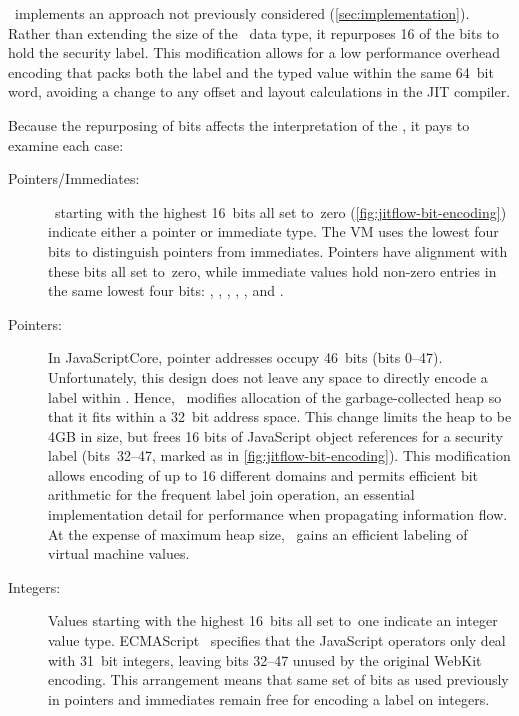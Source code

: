 \JitFlow\ implements an  approach not previously considered (\autoref{sec:implementation}).
Rather than extending the size of the \JSValue\ data type, it repurposes 16 of the bits to hold the security label.
This modification allows for a low performance overhead encoding that packs both the label and the typed value within the same 64~bit word, avoiding a change to any offset and layout calculations in the JIT compiler.

Because the repurposing of bits affects the interpretation of the \JSValue, it pays to examine each case:

\begin{description}

\item[Pointers/Immediates:]
\jsvalues\ starting with the highest 16~bits all set to~zero (\autoref{fig:jitflow-bit-encoding}) indicate either a pointer or immediate type.
The VM uses the lowest four bits to distinguish pointers from immediates.
Pointers have alignment with these bits all set to~zero, while immediate values hold non-zero entries in the same lowest four bits: , , , , , and .

\item[Pointers:]
In JavaScriptCore, pointer addresses occupy 46~bits (bits 0--47).
Unfortunately, this design does not leave any space to directly encode a label within \jsvalues.
Hence, \JitFlow\ modifies allocation of the garbage-collected heap so that it fits within a 32~bit address space.
This change limits the heap to be 4GB in size, but frees 16 bits of JavaScript object references for a security label (bits~32--47, marked as  in \autoref{fig:jitflow-bit-encoding}).
This modification allows encoding of up to 16 different domains and permits efficient bit arithmetic for the frequent label join operation, an essential implementation detail for performance when propagating information flow.
At the expense of maximum heap size, \JitFlow\ gains an efficient labeling of virtual machine values.

\item[Integers:]
Values starting with the highest 16~bits all set to~one indicate an integer value type.
ECMAScript~\cite{ecma} specifies that the JavaScript operators only deal with 31~bit integers, leaving bits 32--47 unused by the original WebKit encoding.
This arrangement means that same set of bits as used previously in pointers and immediates remain free for encoding a label on integers.


\end{description}
